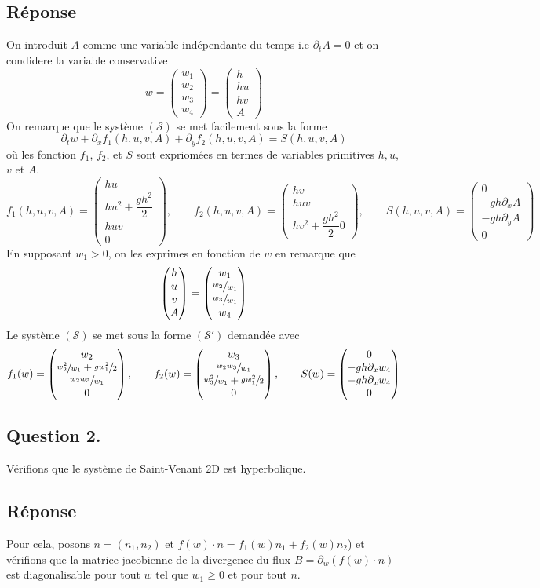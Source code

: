 \documentclass[
	french,
	11pt, %
]{fphw}
\newcommand{\myvec}[3]{\begin{pmatrix} #1  \\ #2 \\ #3 \end{pmatrix}}   %
\renewcommand{\vector}[4]{\begin{pmatrix} #1  \\ #2 \\ #3 \\ #4 \end{pmatrix}}   %
\begin{document}
\subsection*{Réponse} 

On introduit $A$ comme une variable indépendante du temps i.e $\partial_t A = 0$ et on condidere la variable conservative 
$$w= \vector{w_1}{w_2}{w_3}{w_4} = \vector{h}{hu}{hv}{A}$$
On remarque que le système $(\mathcal{S})$ se met facilement sous la forme
$$
\partial_t w + \partial_x f_1(h,u,v,A) + \partial_y f_2(h,u,v,A) = S(h,u,v,A)
$$
où les fonction $f_1$, $f_2$, et $S$ sont expriomées en termes de variables primitives $h, u$, $v$ et $A$. 
$$f_1(h,u,v,A) = \vector{hu}{hu^2 + \dfrac{gh^2}{2}}{huv}{0}, \qquad f_2(h,u,v,A) = \myvec{hv}{huv}{hv^2 + \dfrac{gh^2}{2}{0}}, \qquad S(h,u,v,A) = \vector{0}{-gh\partial_xA}{-gh\partial_y A}{0}$$
En supposant $w_1>0$, on les exprimes en fonction de $w$ en remarque que $$\vector{h}{u}{v}{A} = \vector{w_1}{\sfrac{w_2}{w_1}}{\sfrac{w_3}{w_1}}{w_4}$$
Le système $(\mathcal{S})$ se met sous la forme $(\mathcal{S}')$ demandée avec 
$$f_1(w) = \vector{w_2}{\sfrac{w_2^2}{w_1} + \sfrac{gw_1^2}{2}}{\sfrac{w_2w_3}{w_1}}{0}, \qquad f_2(w) = \vector{w_3}{\sfrac{w_2w_3}{w_1}}{\sfrac{w_3^2}{w_1} + \sfrac{gw_1^2}{2}}{0}, \qquad S(w)=\vector{0}{-gh\partial_x w_4}{-gh\partial_x w_4}{0}$$



\subsection*{Question 2.}

\begin{problem}
Vérifions que le système de Saint-Venant 2D est hyperbolique.
\end{problem}


\subsection*{Réponse} 
Pour cela, posons $n=(n_1,n_2)$ et $f(w)\cdot n = f_1(w)n_1 + f_2(w)n_2$) et vérifions que la matrice jacobienne de la divergence du flux $B = \partial_w \left( f(w)\cdot n \right)$ est diagonalisable pour tout $w$ tel que $w_1 \geq 0$ et pour tout $n$. 
\end{document}

